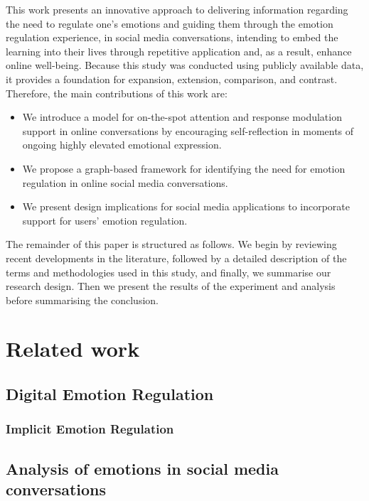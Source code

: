 \documentclass[acmtog]{acmart}
\begin{document}
This work presents an innovative approach to delivering information regarding the need to regulate one's emotions and guiding them through the emotion regulation experience, in social media conversations, intending to embed the learning into their lives through repetitive application and, as a result, enhance online well-being. Because this study was conducted using publicly available data, it provides a foundation for expansion, extension, comparison, and contrast. Therefore, the main contributions of this work are:
\begin{itemize}
    \item We introduce a model for on-the-spot attention and response modulation support in online conversations by encouraging self-reflection in moments of ongoing highly elevated emotional expression.
    \item We propose a graph-based framework for identifying the need for emotion regulation in online social media conversations.
    \item We present design implications for social media applications to incorporate support for users' emotion regulation.
\end{itemize}
The remainder of this paper is structured as follows. We begin by reviewing recent developments in the literature, followed by a detailed description of the terms and methodologies used in this study, and finally, we summarise our research design. Then we present the results of the experiment and analysis before summarising the conclusion.


\section{Related work}

\subsection{Digital Emotion Regulation}
\subsubsection{Implicit Emotion Regulation}

\subsection{Analysis of emotions in social media conversations}
\end{document}
